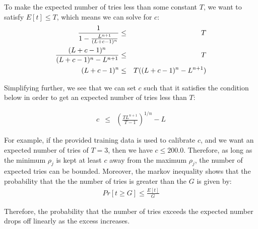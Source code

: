 \documentclass[psamsfonts]{amsart}
\begin{document}
To make the expected number of tries less than some constant $T$, we want to satisfy $E[t] \leq T$, which means we can solve for $c$:
\begin{eqnarray}
{{1} \over {1 - \frac{L^{n+1}}{(L+c-1)^n}}} &\leq& T \\
{{(L+c-1)^n} \over {(L+c-1)^n - L^{n+1}}} &\leq& T \\
(L+c-1)^n &\leq& T ((L+c-1)^n - L^{n+1}) 
\end{eqnarray}

Simplifying further, we see that we can set $c$ such that it satisfies the condition below in order to get an expected number of tries less than $T$:

\begin{eqnarray}
c &\leq& \left( \frac{T L^{n+1}}{T-1} \right)^{1/n} - L 
\end{eqnarray}

For example, if the provided training data is used to calibrate $c$, and we want an expected number of tries of $T = 3$, then we have $c \leq 200.0$. Therefore, as long as the minimum $\rho_j$ is kept at least $c$ away from the maximum $\rho_j$, the number of expected tries can be bounded. Moreover, the markov inequality shows that the probability that the the number of tries is greater than the $G$ is given by:
\begin{eqnarray}
Pr[t \geq G] \leq \frac{E[t]}{G}
\end{eqnarray}

Therefore, the probability that the number of tries exceeds the expected number drops off linearly as the excess increases.
\end{document}
